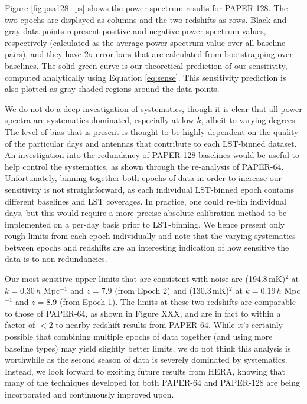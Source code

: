 Figure \ref{fig:psa128_ps} shows the power spectrum results for PAPER-128. The two epochs are displayed as columns and the two redshifts as rows. Black and gray data points represent positive and negative power spectrum values, respectively (calculated as the average power spectrum value over all baseline pairs), and they have $2\sigma$ error bars that are calculated from bootstrapping over baselines. The solid green curve is our theoretical prediction of our sensitivity, computed analytically using Equation \eqref{eq:sense}. This sensitivity prediction is also plotted as gray shaded regions around the data points.

We do not do a deep investigation of systematics, though it is clear that all power spectra are systematics-dominated, especially at low $k$, albeit to varying degrees. The level of bias that is present is thought to be highly dependent on the quality of the particular days and antennas that contribute to each LST-binned dataset. An investigation into the redundancy of PAPER-128 baselines would be useful to help control the systematics, as shown through the re-analysis of PAPER-64. Unfortunately, binning together both epochs of data in order to increase our sensitivity is not straightforward, as each individual LST-binned epoch contains different baselines and LST coverages. In practice, one could re-bin individual days, but this would require a more precise absolute calibration method to be implemented on a per-day basis prior to LST-binning. We hence present only rough limits from each epoch individually and note that the varying systematics between epochs and redshifts are an interesting indication of how sensitive the data is to non-redundancies.

Our most sensitive upper limits that are consistent with noise are (194.8\,mK)$^{2}$ at $k = 0.30\,h$ Mpc$^{-1}$ and $z=7.9$ (from Epoch 2) and (130.3\,mK)$^{2}$ at $k = 0.19\,h$ Mpc$^{-1}$ and $z=8.9$ (from Epoch 1). The limits at these two redshifts are comparable to those of PAPER-64, as shown in Figure XXX, and are in fact to within a factor of $<2$ to nearby redshift results from PAPER-64. While it's certainly possible that combining multiple epochs of data together (and using more baseline types) may yield slightly better limits, we do not think this analysis is worthwhile as the second season of data is severely dominated by systematics. Instead, we look forward to exciting future results from HERA, knowing that many of the techniques developed for both PAPER-64 and PAPER-128 are being incorporated and continuously improved upon.

